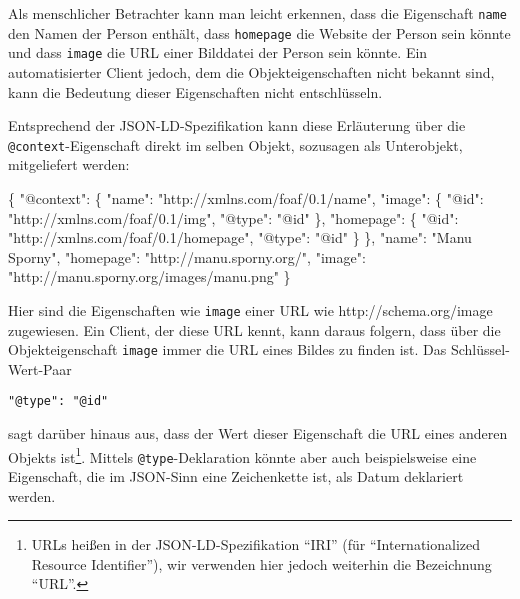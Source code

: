 \documentclass[,a4paper]{article}
\newenvironment{Shaded}{}{}
\newcommand{\DataTypeTok}[1]{\textcolor[rgb]{0.56,0.13,0.00}{{#1}}}
\newcommand{\StringTok}[1]{\textcolor[rgb]{0.25,0.44,0.63}{{#1}}}
\newcommand{\NormalTok}[1]{{#1}}
\begin{document}
Als menschlicher Betrachter kann man leicht erkennen, dass die
Eigenschaft \texttt{name} den Namen der Person enthält, dass
\texttt{homepage} die Website der Person sein könnte und dass
\texttt{image} die URL einer Bilddatei der Person sein könnte. Ein
automatisierter Client jedoch, dem die Objekteigenschaften nicht bekannt
sind, kann die Bedeutung dieser Eigenschaften nicht entschlüsseln.

Entsprechend der JSON-LD-Spezifikation kann diese Erläuterung über die
\texttt{@context}-Eigenschaft direkt im selben Objekt, sozusagen als
Unterobjekt, mitgeliefert werden:

\begin{Shaded}
\begin{Highlighting}[]
\NormalTok{\{}
  \DataTypeTok{"@context"}\NormalTok{:}
  \NormalTok{\{}
    \DataTypeTok{"name"}\NormalTok{: }\StringTok{"http://xmlns.com/foaf/0.1/name"}\NormalTok{,}
    \DataTypeTok{"image"}\NormalTok{: \{}
      \DataTypeTok{"@id"}\NormalTok{: }\StringTok{"http://xmlns.com/foaf/0.1/img"}\NormalTok{,}
      \DataTypeTok{"@type"}\NormalTok{: }\StringTok{"@id"}
    \NormalTok{\},}
    \DataTypeTok{"homepage"}\NormalTok{: \{}
      \DataTypeTok{"@id"}\NormalTok{: }\StringTok{"http://xmlns.com/foaf/0.1/homepage"}\NormalTok{,}
      \DataTypeTok{"@type"}\NormalTok{: }\StringTok{"@id"}
    \NormalTok{\}}
  \NormalTok{\},}
  \DataTypeTok{"name"}\NormalTok{: }\StringTok{"Manu Sporny"}\NormalTok{,}
  \DataTypeTok{"homepage"}\NormalTok{: }\StringTok{"http://manu.sporny.org/"}\NormalTok{,}
  \DataTypeTok{"image"}\NormalTok{: }\StringTok{"http://manu.sporny.org/images/manu.png"}
\NormalTok{\}}
\end{Highlighting}
\end{Shaded}

Hier sind die Eigenschaften wie \texttt{image} einer URL wie
http://schema.org/image zugewiesen. Ein Client, der diese URL kennt,
kann daraus folgern, dass über die Objekteigenschaft \texttt{image}
immer die URL eines Bildes zu finden ist. Das Schlüssel-Wert-Paar

\begin{verbatim}
"@type": "@id"
\end{verbatim}

sagt darüber hinaus aus, dass der Wert dieser Eigenschaft die URL eines
anderen Objekts ist\footnote{URLs heißen in der JSON-LD-Spezifikation
  ``IRI'' (für ``Internationalized Resource Identifier''), wir verwenden
  hier jedoch weiterhin die Bezeichnung ``URL''.}. Mittels
\texttt{@type}-Deklaration könnte aber auch beispielsweise eine
Eigenschaft, die im JSON-Sinn eine Zeichenkette ist, als Datum
deklariert werden.
\end{document}
